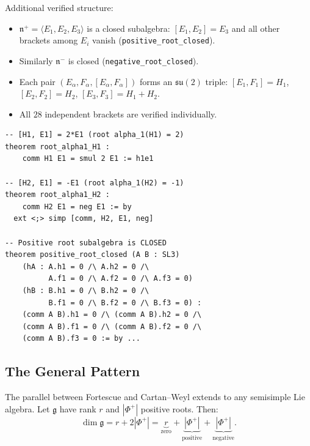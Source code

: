 \documentclass[11pt]{article}
\newcommand{\su}{\mathfrak{su}}
\newcommand{\g}{\mathfrak{g}}
\begin{document}
Additional verified structure:
\begin{itemize}[leftmargin=*]
\item $\mathfrak{n}^+ = \langle E_1, E_2, E_3 \rangle$ is a closed
  subalgebra: $[E_1, E_2] = E_3$ and all other brackets among
  $E_i$ vanish (\texttt{positive\_root\_closed}).
\item Similarly $\mathfrak{n}^-$ is closed (\texttt{negative\_root\_closed}).
\item Each pair $(E_\alpha, F_\alpha, [E_\alpha, F_\alpha])$ forms an
  $\su(2)$ triple: $[E_1, F_1] = H_1$, $[E_2, F_2] = H_2$,
  $[E_3, F_3] = H_1 + H_2$.
\item All $28$ independent brackets are verified individually.
\end{itemize}

\begin{lstlisting}[caption={Root eigenvalue verification and subalgebra closure for $\su(3)$ (excerpts from \texttt{su3\_cartan\_weyl.lean}).}]
-- [H1, E1] = 2*E1 (root alpha_1(H1) = 2)
theorem root_alpha1_H1 :
    comm H1 E1 = smul 2 E1 := h1e1

-- [H2, E1] = -E1 (root alpha_1(H2) = -1)
theorem root_alpha1_H2 :
    comm H2 E1 = neg E1 := by
  ext <;> simp [comm, H2, E1, neg]

-- Positive root subalgebra is CLOSED
theorem positive_root_closed (A B : SL3)
    (hA : A.h1 = 0 /\ A.h2 = 0 /\
          A.f1 = 0 /\ A.f2 = 0 /\ A.f3 = 0)
    (hB : B.h1 = 0 /\ B.h2 = 0 /\
          B.f1 = 0 /\ B.f2 = 0 /\ B.f3 = 0) :
    (comm A B).h1 = 0 /\ (comm A B).h2 = 0 /\
    (comm A B).f1 = 0 /\ (comm A B).f2 = 0 /\
    (comm A B).f3 = 0 := by ...
\end{lstlisting}

\subsection{The General Pattern}

The parallel between Fortescue and Cartan--Weyl extends to any
semisimple Lie algebra. Let $\g$ have rank $r$ and $|\Phi^+|$ positive
roots. Then:
\begin{equation}\label{eq:general-decomp}
  \dim \g = r + 2|\Phi^+|
    = \underbrace{r}_{\text{zero}} + \underbrace{|\Phi^+|}_{\text{positive}}
    + \underbrace{|\Phi^+|}_{\text{negative}}.
\end{equation}
\end{document}
